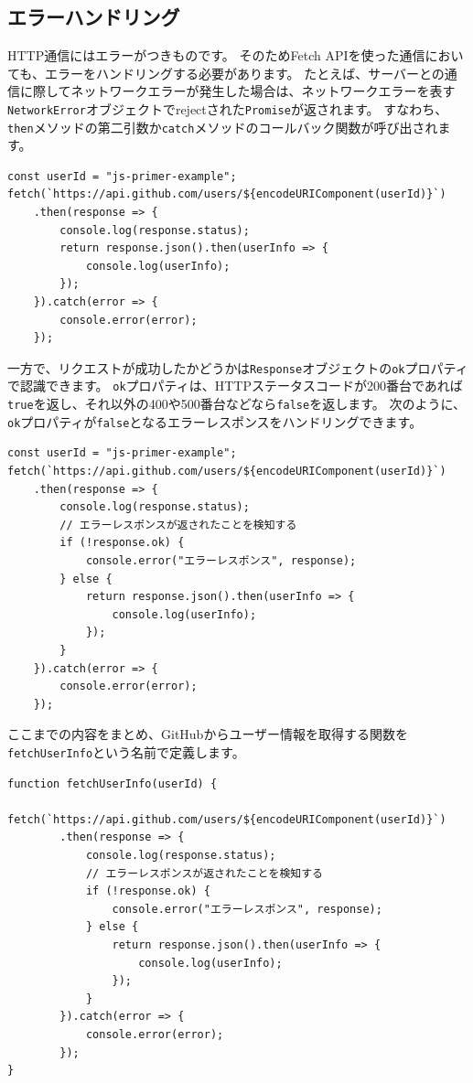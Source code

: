 \hypertarget{error-handling}{%
\subsection{エラーハンドリング}\label{error-handling}}

HTTP通信にはエラーがつきものです。 そのためFetch
APIを使った通信においても、エラーをハンドリングする必要があります。
たとえば、サーバーとの通信に際してネットワークエラーが発生した場合は、ネットワークエラーを表す\texttt{NetworkError}オブジェクトでrejectされた\texttt{Promise}が返されます。
すなわち、\texttt{then}メソッドの第二引数か\texttt{catch}メソッドのコールバック関数が呼び出されます。

\begin{lstlisting}
const userId = "js-primer-example";
fetch(`https://api.github.com/users/${encodeURIComponent(userId)}`)
    .then(response => {
        console.log(response.status);
        return response.json().then(userInfo => {
            console.log(userInfo);
        });
    }).catch(error => {
        console.error(error);
    });
\end{lstlisting}

一方で、リクエストが成功したかどうかは\texttt{Response}オブジェクトの\texttt{ok}プロパティで認識できます。
\texttt{ok}プロパティは、HTTPステータスコードが200番台であれば\texttt{true}を返し、それ以外の400や500番台などなら\texttt{false}を返します。
次のように、\texttt{ok}プロパティが\texttt{false}となるエラーレスポンスをハンドリングできます。

\begin{lstlisting}
const userId = "js-primer-example";
fetch(`https://api.github.com/users/${encodeURIComponent(userId)}`)
    .then(response => {
        console.log(response.status); 
        // エラーレスポンスが返されたことを検知する
        if (!response.ok) {
            console.error("エラーレスポンス", response);
        } else {
            return response.json().then(userInfo => {
                console.log(userInfo);
            });
        }
    }).catch(error => {
        console.error(error);
    });
\end{lstlisting}

ここまでの内容をまとめ、GitHubからユーザー情報を取得する関数を\texttt{fetchUserInfo}という名前で定義します。

\begin{lstlisting}
function fetchUserInfo(userId) {
    fetch(`https://api.github.com/users/${encodeURIComponent(userId)}`)
        .then(response => {
            console.log(response.status);
            // エラーレスポンスが返されたことを検知する
            if (!response.ok) {
                console.error("エラーレスポンス", response);
            } else {
                return response.json().then(userInfo => {
                    console.log(userInfo);
                });
            }
        }).catch(error => {
            console.error(error);
        });
}
\end{lstlisting}

